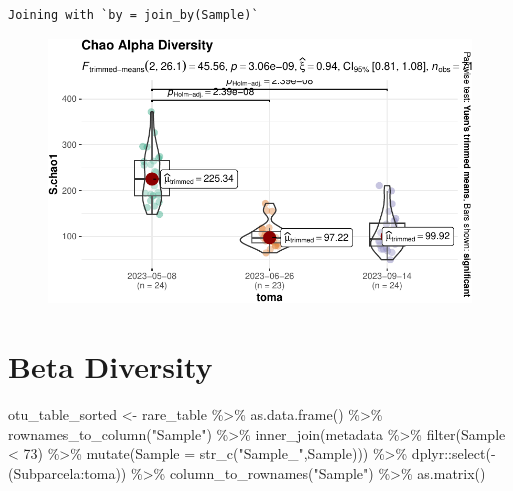 \documentclass[
  letterpaper,
  DIV=11,
  numbers=noendperiod]{scrartcl}
\newenvironment{Shaded}{\begin{snugshade}}{\end{snugshade}}
\newcommand{\AttributeTok}[1]{\textcolor[rgb]{0.40,0.45,0.13}{#1}}
\newcommand{\DecValTok}[1]{\textcolor[rgb]{0.68,0.00,0.00}{#1}}
\newcommand{\FunctionTok}[1]{\textcolor[rgb]{0.28,0.35,0.67}{#1}}
\newcommand{\NormalTok}[1]{\textcolor[rgb]{0.00,0.23,0.31}{#1}}
\newcommand{\OtherTok}[1]{\textcolor[rgb]{0.00,0.23,0.31}{#1}}
\newcommand{\SpecialCharTok}[1]{\textcolor[rgb]{0.37,0.37,0.37}{#1}}
\newcommand{\StringTok}[1]{\textcolor[rgb]{0.13,0.47,0.30}{#1}}
\begin{document}
\begin{verbatim}
Joining with `by = join_by(Sample)`
\end{verbatim}

\begin{figure}[H]

{\centering \includegraphics{InformeNeiker_files/figure-pdf/unnamed-chunk-8-2.pdf}

}

\end{figure}

\hypertarget{beta-diversity}{%
\section{Beta Diversity}\label{beta-diversity}}

\begin{Shaded}
\begin{Highlighting}[]
\NormalTok{otu\_table\_sorted }\OtherTok{\textless{}{-}}\NormalTok{ rare\_table }\SpecialCharTok{\%\textgreater{}\%} 
  \FunctionTok{as.data.frame}\NormalTok{() }\SpecialCharTok{\%\textgreater{}\%} 
  \FunctionTok{rownames\_to\_column}\NormalTok{(}\StringTok{"Sample"}\NormalTok{) }\SpecialCharTok{\%\textgreater{}\%} 
  \FunctionTok{inner\_join}\NormalTok{(metadata }\SpecialCharTok{\%\textgreater{}\%} 
               \FunctionTok{filter}\NormalTok{(Sample }\SpecialCharTok{\textless{}} \DecValTok{73}\NormalTok{) }\SpecialCharTok{\%\textgreater{}\%} 
               \FunctionTok{mutate}\NormalTok{(}\AttributeTok{Sample =} \FunctionTok{str\_c}\NormalTok{(}\StringTok{"Sample\_"}\NormalTok{,Sample))) }\SpecialCharTok{\%\textgreater{}\%} 
\NormalTok{  dplyr}\SpecialCharTok{::}\FunctionTok{select}\NormalTok{(}\SpecialCharTok{{-}}\NormalTok{(Subparcela}\SpecialCharTok{:}\NormalTok{toma)) }\SpecialCharTok{\%\textgreater{}\%} \FunctionTok{column\_to\_rownames}\NormalTok{(}\StringTok{"Sample"}\NormalTok{) }\SpecialCharTok{\%\textgreater{}\%} \FunctionTok{as.matrix}\NormalTok{()}
\end{Highlighting}
\end{Shaded}
\end{document}
